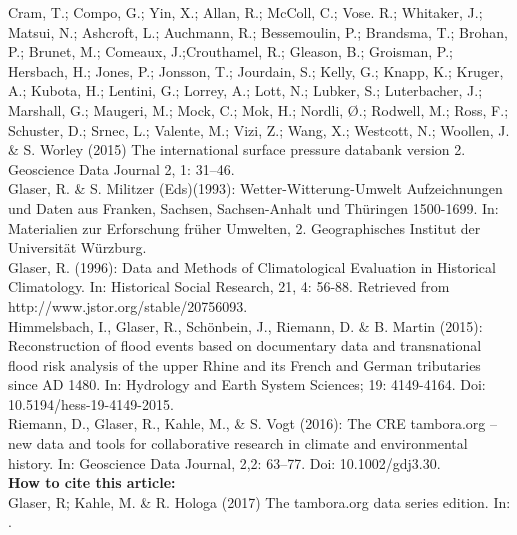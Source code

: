 Cram, T.; Compo, G.; Yin, X.; Allan, R.; McColl, C.; Vose. R.; Whitaker, J.; Matsui, N.; Ashcroft, L.; Auchmann, R.; Bessemoulin, P.; Brandsma, T.; Brohan, P.; Brunet, M.; Comeaux, J.;Crouthamel, R.; Gleason, B.; Groisman, P.; Hersbach, H.; Jones, P.; Jonsson, T.; Jourdain, S.; Kelly, G.; Knapp, K.; Kruger, A.; Kubota, H.; Lentini, G.; Lorrey, A.; Lott, N.; Lubker, S.; Luterbacher, J.; Marshall, G.; Maugeri, M.; Mock, C.; Mok, H.; Nordli, Ø.; Rodwell, M.; Ross, F.; Schuster, D.; Srnec, L.; Valente, M.; Vizi, Z.; Wang, X.; Westcott, N.; Woollen, J. \& S. Worley (2015) The international surface pressure databank version 2. Geoscience Data Journal 2, 1: 31–46.\\
Glaser, R. \& S. Militzer (Eds)(1993): Wetter-Witterung-Umwelt Aufzeichnungen und Daten aus Franken, Sachsen, Sachsen-Anhalt und Thüringen 1500-1699. In: Materialien zur Erforschung früher Umwelten, 2. Geographisches Institut der Universität Würzburg.\\
Glaser, R. (1996): Data and Methods of Climatological Evaluation in Historical Climatology. In: Historical Social Research, 21, 4: 56-88. Retrieved from http://www.jstor.org/stable/20756093.\\
Himmelsbach, I., Glaser, R., Schönbein, J., Riemann, D. \& B. Martin (2015): Reconstruction of flood events based on documentary data and transnational flood risk analysis of the upper Rhine and its French and German tributaries since AD 1480. In: Hydrology and Earth System Sciences; 19: 4149-4164. Doi: 10.5194/hess-19-4149-2015.\\
Riemann, D., Glaser, R., Kahle, M., \& S. Vogt (2016): The CRE tambora.org – new data and tools for collaborative research in climate and environmental history. In: Geoscience Data Journal, 2,2: 63–77. Doi: 10.1002/gdj3.30.\\

\vspace*{\fill}
\noindent
\textbf{How to cite this article:}\\
Glaser, R; Kahle, M. \& R. Hologa (2017) The tambora.org data series edition. In:  .\\
\href{dx.\ExecuteMetaData[variables.tex]{doinotes}}{}